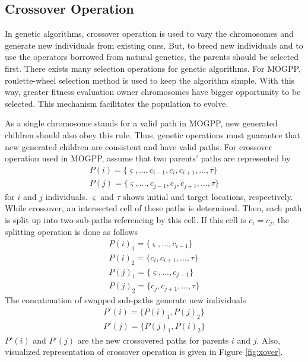 \subsection{Crossover Operation}

In genetic algorithms, crossover operation is used to vary the chromosomes and generate new individuals from existing ones. But, to breed new individuals and to use the operators borrowed from natural genetics, the parents should be selected first. There exists many selection operations for genetic algorithms. For MOGPP, roulette-wheel selection method is used to keep the algorithm simple. With this way, greater fitness evaluation owner chromosomes have bigger opportunity to be selected. This mechanism facilitates the population to evolve.

As a single chromosome stands for a valid path in MOGPP, new generated children should also obey this rule. Thus, genetic operations must guarantee that new generated children are consistent and have valid paths. For crossover operation used in MOGPP, assume that two parents' paths are represented by 
\begin{gather*}
P(i)=\lbrace \varsigma, ..., c_{i-1}, c_{i}, c_{i+1}, ..., \tau \rbrace \\
P(j)=\lbrace \varsigma, ..., c_{j-1}, c_{j}, c_{j+1}, ..., \tau \rbrace
\end{gather*}
for $i$ and $j$ individuals. $\varsigma$ and $\tau$ shows initial and target locations, respectively. While crossover, an intersected cell of these paths is determined. Then, each path is split up into two sub-paths referencing by this cell. If this cell is $c_{i} = c_{j}$, the splitting operation is done as follows
\begin{gather*}
P(i)_{1}=\lbrace \varsigma, ..., c_{i-1} \rbrace \\
P(i)_{2}=\lbrace c_{i}, c_{i+1}, ..., \tau \rbrace \\
P(j)_{1}=\lbrace \varsigma, ..., c_{j-1} \rbrace \\
P(j)_{2}=\lbrace c_{j}, c_{j+1}, ..., \tau \rbrace
\end{gather*}
The concatenation of swapped sub-paths generate new individuals
\begin{gather*}
P'(i)=\lbrace P(i)_{1}, P(j)_{2} \rbrace \\
P'(j)=\lbrace P(j)_{1}, P(i)_{2} \rbrace 
\end{gather*}
$P'(i)$ and $P'(j)$ are the new crossovered paths for parents $i$ and $j$. Also, visualized representation of crossover operation is given in Figure \ref{fig:xover}.

